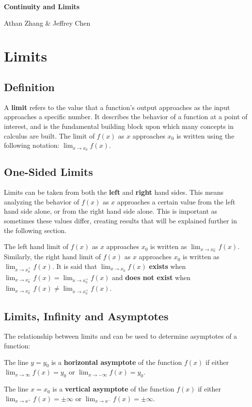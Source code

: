\documentclass[11pt]{article}
\begin{document}
\textbf{\Huge Continuity and Limits}

Athan Zhang \& Jeffrey Chen

\section{Limits}

\subsection{Definition}
A \textbf{limit} refers to the value that a function's output approaches as the input approaches a specific number. It describes the behavior of a function at a point of interest, and is the fundamental building block upon which many concepts in calculus are built. The limit of $f(x)$ as $x$ approaches $x_0$ is written using the following notation: $\lim_{x\to x_0} f(x)$. 

\subsection{One-Sided Limits}
Limits can be taken from both the \textbf{left} and \textbf{right} hand sides. This means analyzing the behavior of $f(x)$ as $x$ approaches a certain value from the left hand side alone, or from the right hand side alone. This is important as sometimes these values differ, creating results that will be explained further in the following section. 

The left hand limit of $f(x)$ as $x$ approaches $x_0$ is written as $\lim_{x\to x_0^-} f(x)$. Similarly, the right hand limit of $f(x)$ as $x$ approaches $x_0$ is written as $\lim_{x\to x_0^+} f(x)$. It is said that $\lim_{x\to x_0} f(x)$ \textbf{exists} when $\lim_{x\to x_0^-} f(x) = \lim_{x\to x_0^+} f(x)$ and \textbf{does not exist} when $\lim_{x\to x_0^-} f(x) \neq \lim_{x\to x_0^+} f(x)$.

\subsection{Limits, Infinity and Asymptotes}
The relationship between limits and \pm \infty\;can be used to determine asymptotes of a function:

The line $y=y_0$ is a \textbf{horizontal asymptote} of the function $f(x)$ if either $\lim_{x\to \infty} f(x) = y_0$ or $\lim_{x\to -\infty} f(x) = y_0$.

The line $x=x_0$ is a \textbf{vertical asymptote} of the function $f(x)$ if either $\lim_{x\to a^+} f(x) = \pm \infty$ or $\lim_{x\to a^-} f(x) = \pm \infty$.
\end{document}
